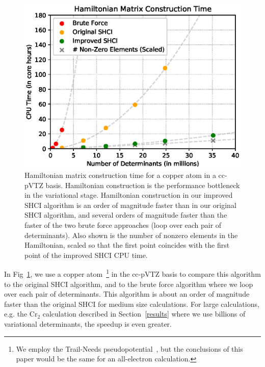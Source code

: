 \documentclass[%
reprint,
 superscriptaddress,
 amsmath,amssymb,
 aps,
]{revtex4-1}
\begin{document}
\begin{figure}
  \includegraphics[width=\linewidth]{speedup/speedup.eps}
  \caption{Hamiltonian matrix construction time for a copper atom in a cc-pVTZ basis. Hamiltonian construction is the performance bottleneck in the variational stage.
Hamiltonian construction in our improved SHCI algorithm is an order of magnitude faster than in
our original SHCI algorithm, and several orders of magnitude faster than the faster of the two brute force
approaches (loop over each pair of determinants).
Also shown is the number of nonzero elements in the Hamiltonian, scaled so that the first point coincides with
the first point of the improved SHCI CPU time.}
  \label{fig:ham}
\end{figure}

In Fig~\ref{fig:ham}, we use a copper atom~\footnote{We employ the Trail-Needs pseudopotential~\cite{TraNee-JCP-15},
but the conclusions of this paper would be the same for an all-electron calculation.}
in the cc-pVTZ basis to compare this algorithm to the original SHCI algorithm,
and to the brute force algorithm where we loop over each pair of determinants.
This algorithm
is about an order of magnitude faster than the original SHCI for medium size calculations.
For large calculations, e.g. the Cr$_2$ calculation described in Section~\ref{results}
where we use billions of variational determinants, the speedup is even greater.
\end{document}
